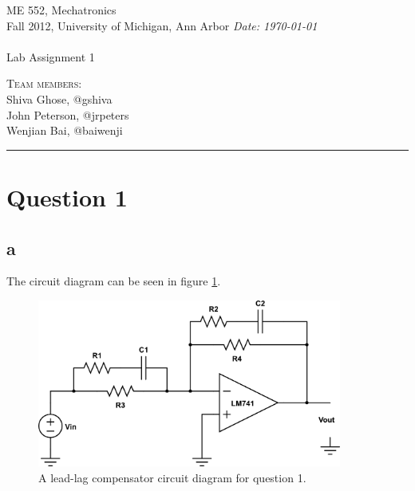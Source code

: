 \documentclass{article}
\newcommand{\shortbar}{\begin{center}\rule{5ex}{0.1pt}\end{center}}
\newcommand{\courseNumber}{ME 552}
\newcommand{\courseTitle}{Mechatronics}
\newcommand{\semester}{Fall 2012}
\theoremstyle{plain}
\theoremstyle{definition}
\theoremstyle{remark}
\newenvironment{solution}[1]{\medskip\noindent{\bf Problem #1.~}}{\shortbar}
\newcommand{\solutions}[4]{
\vspace{-2ex}
\begin{center}
{\small  \courseNumber, \courseTitle
\hfill {\Large \bf {#1} }\\
\semester, University of Michigan, Ann Arbor \hfill
{\em Date: #3}}\\
\vspace{-1ex}
\hrulefill\\
\vspace{4ex}
{\LARGE Lab Assignment #2}\\
\vspace{2ex}
\end{center}
\begin{trivlist}
\item \textsc{Team members:\\} {#4}
\end{trivlist}
\noindent
\shortbar
\vspace{3ex}
}
\begin{document}
\solutions{}{1}{\today}{Shiva Ghose, @gshiva\\ John Peterson, @jrpeters\\ Wenjian Bai, @baiwenji}
%
%

\section*{Question 1}
\subsection*{a}
The circuit diagram can be seen in figure \ref{q1_a}.
\begin{figure}[h]
\begin{center}
\includegraphics[width=10cm]{q1_circuitDiagram.png}
\end{center}
\caption{A lead-lag compensator circuit diagram for question 1.}
\label{q1_a}
\end{figure}
\end{document}
